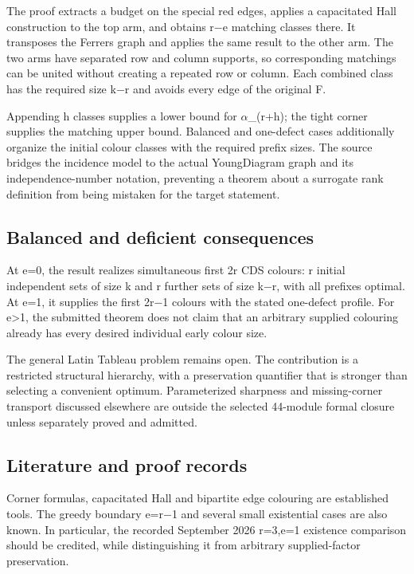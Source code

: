\documentclass[11pt,a4paper]{article}
\begin{document}
The proof extracts a budget on the special red edges, applies a capacitated Hall construction to the top arm, and obtains r\ensuremath{-}e matching classes there. It transposes the Ferrers graph and applies the same result to the other arm. The two arms have separated row and column supports, so corresponding matchings can be united without creating a repeated row or column. Each combined class has the required size k\ensuremath{-}r and avoids every edge of the original F.

Appending h classes supplies a lower bound for \ensuremath{\alpha}\_(r+h); the tight corner supplies the matching upper bound. Balanced and one-defect cases additionally organize the initial colour classes with the required prefix sizes. The source bridges the incidence model to the actual YoungDiagram graph and its independence-number notation, preventing a theorem about a surrogate rank definition from being mistaken for the target statement.

\subsection{Balanced and deficient consequences}
At e=0, the result realizes simultaneous first 2r CDS colours: r initial independent sets of size k and r further sets of size k\ensuremath{-}r, with all prefixes optimal. At e=1, it supplies the first 2r\ensuremath{-}1 colours with the stated one-defect profile. For e>1, the submitted theorem does not claim that an arbitrary supplied colouring already has every desired individual early colour size.

The general Latin Tableau problem remains open. The contribution is a restricted structural hierarchy, with a preservation quantifier that is stronger than selecting a convenient optimum. Parameterized sharpness and missing-corner transport discussed elsewhere are outside the selected 44-module formal closure unless separately proved and admitted.

\subsection{Literature and proof records}
Corner formulas, capacitated Hall and bipartite edge colouring are established tools. The greedy boundary e=r\ensuremath{-}1 and several small existential cases are also known. In particular, the recorded September 2026 r=3,e=1 existence comparison should be credited, while distinguishing it from arbitrary supplied-factor preservation.
\end{document}
